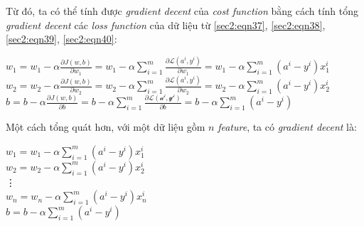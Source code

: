 Từ đó, ta có thể tính được \textit{gradient decent} của \textit{cost function} bằng cách tính tổng \textit{gradient decent} các \textit{loss function} của dữ liệu từ \ref{sec2:eqn37}, \ref{sec2:eqn38}, \ref{sec2:eqn39}, \ref{sec2:eqn40}:
\begin{center}
$w_{1} = w_{1} - \alpha\frac{\partial J(w,b)}{\partial w_{1}} = w_{1} - \alpha\sum_{i=1}^m\frac{\partial \mathcal{L} (a^{i}, y^{i})}{\partial w_{1}} = w_{1} - \alpha\sum_{i=1}^m(a^{i} - y^{i})x_{1}^{i}$\\
$w_{2} = w_{2} - \alpha\frac{\partial J(w,b)}{\partial w_{2}} = w_{2} - \alpha\sum_{i=1}^m\frac{\partial \mathcal{L}(a^{i}, y^{i})}{\partial w_{2}} = w_{2} - \alpha\sum_{i=1}^m(a^{i} - y^{i})x_{2}^{i}$\\
$b = b - \alpha\frac{\partial J(w,b)}{\partial b} = b - \alpha\sum_{i=1}^m\frac{\partial \mathcal{L(a^{i}, y^{i})}}{\partial b} = b - \alpha\sum_{i=1}^m(a^{i} - y^{i})$
\end{center}

Một cách tổng quát hơn, với một dữ liệu gồm $n$ \textit{feature}, ta có \textit{gradient decent} là:
\begin{center}
$w_{1} =  w_{1} - \alpha\sum_{i=1}^m(a^{i} - y^{i})x_{1}^{i}$\\
$w_{2} =  w_{2} - \alpha\sum_{i=1}^m(a^{i} - y^{i})x_{2}^{i}$\\
\quad     \vdots\\
$w_{n} = w_{n} - \alpha\sum_{i=1}^m(a^{i} - y^{i})x_{n}^{i}$\\
$b =  b - \alpha\sum_{i=1}^m(a^{i} - y^{i})$
\end{center}

